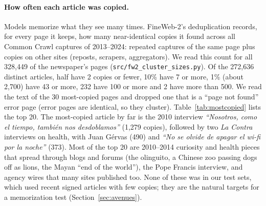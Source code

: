 \documentclass[10pt,a4paper]{article}
\begin{document}
\paragraph{How often each article was copied.} Models memorize what they see many times. FineWeb-2's deduplication
records, for every page it keeps, how many near-identical copies it found across all Common Crawl captures of
2013--2024: repeated captures of the same page plus copies on other sites (reposts, scrapers, aggregators). We read
this count for all 328,449 of the newspaper's pages (\texttt{src/fw2\_cluster\_sizes.py}). Of the 272,636 distinct
articles, half have 2 copies or fewer, 10\% have 7 or more, 1\% (about 2,700) have 43 or more, 232 have 100 or more
and 2 have more than 500. We read the text of the 30 most-copied pages and dropped one that is a ``page not found''
error page (error pages are identical, so they cluster). Table~\ref{tab:mostcopied} lists the top 20. The most-copied
article by far is the 2010 interview \emph{``Nosotros, como el tiempo, también nos desdoblamos''} (1,279 copies),
followed by two \emph{La Contra} interviews on health, with Juan Gérvas (490) and \emph{``No se olvide de apagar el
wi-fi por la noche''} (373). Most of the top 20 are 2010--2014 curiosity and health pieces that spread through
blogs and forums (the olinguito, a Chinese zoo passing dogs off as lions, the Mayan ``end of the world''), the Pope
Francis interview, and agency wires that many sites published too. None of these was in our test sets, which used
recent signed articles with few copies; they are the natural targets for a memorization test (Section~\ref{sec:avenues}).
\end{document}
